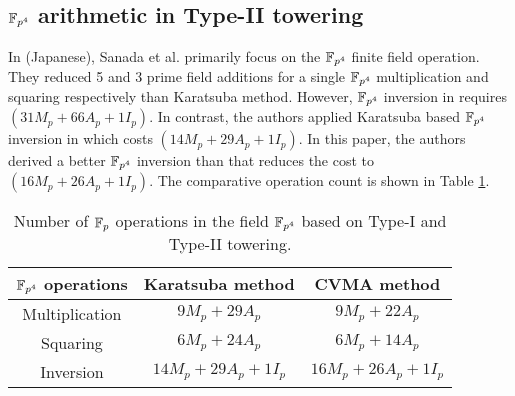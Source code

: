 \subsection{$\mathbb{F}_{p^4}$ arithmetic in Type-II towering}
In \cite{cvma_sanada} (Japanese), Sanada et al. primarily focus on the $\mathbb{F}_{p^4}$ finite field operation.
They reduced 5 and 3 prime field additions for a single $\mathbb{F}_{p^4}$ multiplication and squaring respectively than Karatsuba method.
However, $\mathbb{F}_{p^4}$ inversion in \cite{cvma_sanada} requires $(31 M_p +66A_p+1I_p)$.
In contrast, the authors applied Karatsuba based $\mathbb{F}_{p^4}$ inversion in \cite{INDOCRYPT:KNGDNK17} which costs $(14 M_p +29A_p+1I_p)$.
In this paper, the authors derived a better $\mathbb{F}_{p^4}$ inversion than \cite{cvma_sanada} that reduces the cost to $(16M_p+26A_p+1I_p)$. 
The comparative operation count is shown in Table \ref{tab_fp4_operation}.
\renewcommand{\baselinestretch}{1.5}
\begin{table*}[!h]
	\centering
	\begin{tabular}{|c|c|c|}
		\hline
		$\mathbb{F}_{p^4}  $ operations & Karatsuba method               & CVMA  method \\
		\hline
		Multiplication    & $9M_p + 29A_p$     & $9M_p+22A_p$       \\ \hline
		Squaring          & $6M_p+24A_p$       & $6M_p+14A_p$       \\ \hline
		Inversion         & $14M_p+29A_p+1I_p$ & $16M_p+26A_p+1I_p$ \\ \hline
	\end{tabular}
	\caption{Number of ${\mathbb{F}}_{p}$ operations in the field $\mathbb{F}_{p^4}$ based on Type-I and Type-II towering.}
	\label{tab_fp4_operation}
\end{table*}
\renewcommand{\baselinestretch}{1.0}
